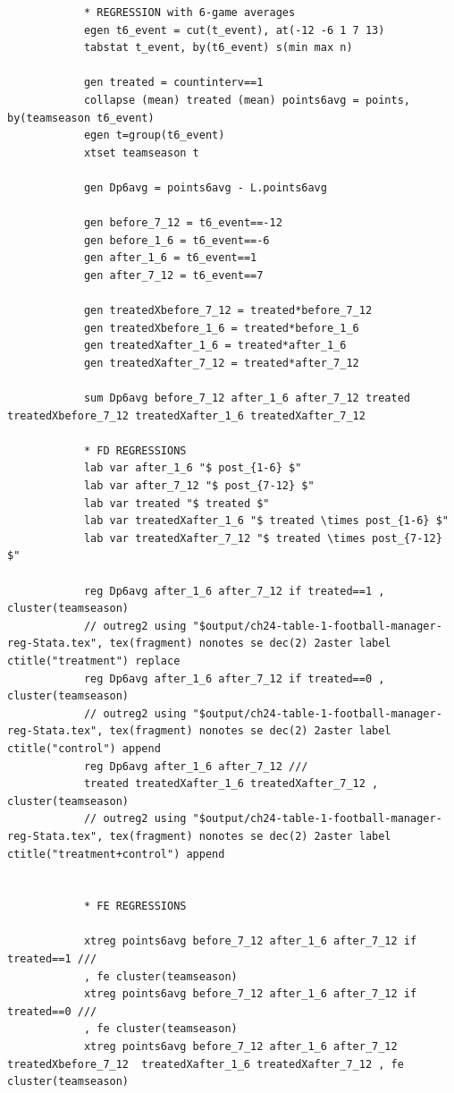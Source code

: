 \documentclass[cn,12pt,math=newtx,citestyle=gb7714-2015,bibstyle=gb7714-2015]{elegantbook}
\begin{document}
	    \begin{lstlisting}
	    	* REGRESSION with 6-game averages
	    	egen t6_event = cut(t_event), at(-12 -6 1 7 13)
	    	tabstat t_event, by(t6_event) s(min max n)
	    	
	    	gen treated = countinterv==1
	    	collapse (mean) treated (mean) points6avg = points, by(teamseason t6_event)
	    	egen t=group(t6_event)
	    	xtset teamseason t
	    	
	    	gen Dp6avg = points6avg - L.points6avg 
	    	
	    	gen before_7_12 = t6_event==-12
	    	gen before_1_6 = t6_event==-6
	    	gen after_1_6 = t6_event==1
	    	gen after_7_12 = t6_event==7
	    	
	    	gen treatedXbefore_7_12 = treated*before_7_12
	    	gen treatedXbefore_1_6 = treated*before_1_6
	    	gen treatedXafter_1_6 = treated*after_1_6
	    	gen treatedXafter_7_12 = treated*after_7_12
	    	
	    	sum Dp6avg before_7_12 after_1_6 after_7_12 treated treatedXbefore_7_12 treatedXafter_1_6 treatedXafter_7_12 
	    	
	    	* FD REGRESSIONS
	    	lab var after_1_6 "$ post_{1-6} $"
	    	lab var after_7_12 "$ post_{7-12} $"
	    	lab var treated "$ treated $"
	    	lab var treatedXafter_1_6 "$ treated \times post_{1-6} $"
	    	lab var treatedXafter_7_12 "$ treated \times post_{7-12} $"
	    	
	    	reg Dp6avg after_1_6 after_7_12 if treated==1 , cluster(teamseason)
	    	// outreg2 using "$output/ch24-table-1-football-manager-reg-Stata.tex", tex(fragment) nonotes se dec(2) 2aster label ctitle("treatment") replace
	    	reg Dp6avg after_1_6 after_7_12 if treated==0 , cluster(teamseason)
	    	// outreg2 using "$output/ch24-table-1-football-manager-reg-Stata.tex", tex(fragment) nonotes se dec(2) 2aster label ctitle("control") append
	    	reg Dp6avg after_1_6 after_7_12 ///
	    	treated treatedXafter_1_6 treatedXafter_7_12 , cluster(teamseason)
	    	// outreg2 using "$output/ch24-table-1-football-manager-reg-Stata.tex", tex(fragment) nonotes se dec(2) 2aster label ctitle("treatment+control") append
	    	
	    	
	    	* FE REGRESSIONS
	    	
	    	xtreg points6avg before_7_12 after_1_6 after_7_12 if treated==1 ///
	    	, fe cluster(teamseason)
	    	xtreg points6avg before_7_12 after_1_6 after_7_12 if treated==0 ///
	    	, fe cluster(teamseason)
	    	xtreg points6avg before_7_12 after_1_6 after_7_12 treatedXbefore_7_12  treatedXafter_1_6 treatedXafter_7_12 , fe cluster(teamseason)
	    \end{lstlisting}
	    
\end{document}
